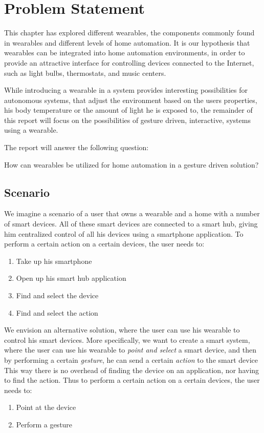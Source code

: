 \section{Problem Statement}\label{sec:researchstatement}
This chapter has explored different wearables, 
the components commonly found in wearables and different levels of home automation. 
It is our hypothesis that wearables can be integrated into home automation environments, 
in order to provide an attractive interface for controlling devices connected to the Internet, 
such as light bulbs, thermostats, and music centers.

While introducing a wearable in a system provides interesting possibilities for autonomous systems, 
that adjust the environment based on the users properties, 
\eg his body temperature or the amount of light he is exposed to,
the remainder of this report will focus on the possibilities of gesture driven, \ie interactive, systems using a wearable.

The report will answer the following question:

\begin{framed}
      How can wearables be utilized for home automation in a gesture driven solution?
\end{framed}

\subsection{Scenario}
We imagine a scenario of a user that owns a wearable and a home with a number of smart devices. 
All of these smart devices are connected to a smart hub, 
giving him centralized control of all his devices using \eg a smartphone application.
To perform a certain action on a certain devices, the user needs to:
\begin{enumerate}
  \item Take up his smartphone
  \item Open up his smart hub application
  \item Find and select the device
  \item Find and select the action
\end{enumerate}

We envision an alternative solution, 
where the user can use his wearable to control his smart devices. 
More specifically, we want to create a smart system, 
where the user can use his wearable to \emph{point and select} a smart device, 
and then by performing a certain \emph{gesture}, he can send a certain \emph{action} to the smart device
This way there is no overhead of finding the device on an application, 
nor having to find the action. 
Thus to perform a certain action on a certain devices, the user needs to:
\begin{enumerate}
  \item Point at the device
  \item Perform a gesture
\end{enumerate}

